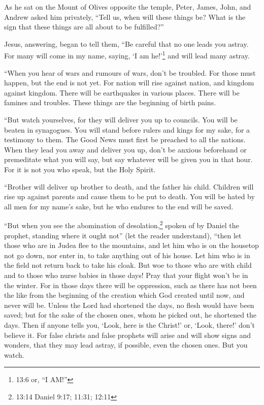  As he sat on the Mount of Olives opposite the temple,
Peter, James, John, and Andrew asked him privately,  ``Tell
us, when will these things be? What is the sign that these things are
all about to be fulfilled?''

 Jesus, answering, began to tell them, ``Be careful that no
one leads you astray.  For many will come in my name,
saying, `I am he!'\footnote{13:6 or, ``I AM!''} and will lead many
astray.

 ``When you hear of wars and rumours of wars, don't be
troubled. For those must happen, but the end is not yet. 
For nation will rise against nation, and kingdom against kingdom. There
will be earthquakes in various places. There will be famines and
troubles. These things are the beginning of birth pains.

 ``But watch yourselves, for they will deliver you up to
councils. You will be beaten in synagogues. You will stand before rulers
and kings for my sake, for a testimony to them.  The Good
News must first be preached to all the nations.  When they
lead you away and deliver you up, don't be anxious beforehand or
premeditate what you will say, but say whatever will be given you in
that hour. For it is not you who speak, but the Holy Spirit.

 ``Brother will deliver up brother to death, and the father
his child. Children will rise up against parents and cause them to be
put to death.  You will be hated by all men for my name's
sake, but he who endures to the end will be saved.

 ``But when you see the abomination of
desolation,\footnote{13:14 Daniel 9:17; 11:31; 12:11} spoken of by
Daniel the prophet, standing where it ought not'' (let the reader
understand), ``then let those who are in Judea flee to the mountains,
 and let him who is on the housetop not go down, nor enter
in, to take anything out of his house.  Let him who is in
the field not return back to take his cloak.  But woe to
those who are with child and to those who nurse babies in those days!
 Pray that your flight won't be in the winter.
 For in those days there will be oppression, such as there
has not been the like from the beginning of the creation which God
created until now, and never will be.  Unless the Lord had
shortened the days, no flesh would have been saved; but for the sake of
the chosen ones, whom he picked out, he shortened the days.
 Then if anyone tells you, `Look, here is the Christ!' or,
`Look, there!' don't believe it.  For false christs and
false prophets will arise and will show signs and wonders, that they may
lead astray, if possible, even the chosen ones.  But you
watch.

